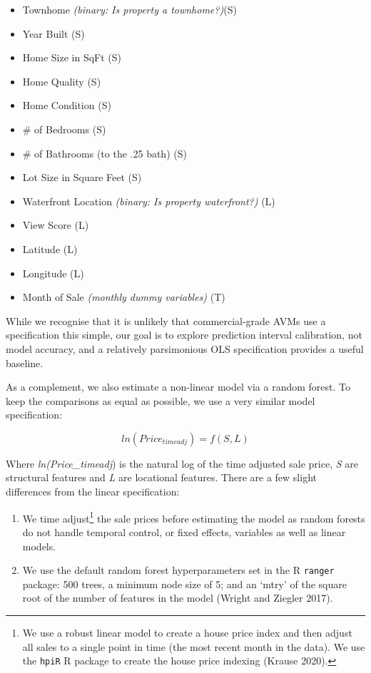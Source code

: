 \documentclass[colTwo]{anon}
\theoremstyle{definition}
\begin{document}
\begin{itemize}
\item Townhome \textit{(binary: Is property a townhome?)}(S)
\item Year Built (S)
\item Home Size in SqFt (S)
\item Home Quality (S)
\item Home Condition (S)
\item \# of Bedrooms (S)
\item \# of Bathrooms (to the .25 bath) (S)
\item Lot Size in Square Feet (S)
\item Waterfront Location \textit{(binary: Is property waterfront?)} (L)
\item View Score (L)
\item Latitude (L)
\item Longitude (L)
\item Month of Sale \textit{(monthly dummy variables)} (T)
\end{itemize}

While we recognise that it is unlikely that commercial-grade AVMs use a specification this simple, our goal is to explore prediction interval calibration, not model accuracy, and a relatively parsimonious OLS specification provides a useful baseline.

As a complement, we also estimate a non-linear model via a random forest.  To keep the comparisons as equal as possible, we use a very similar model specification:

\[ln(Price_{timeadj}) = f(S, L) \]

Where \textit{ln(Price\_timeadj}) is the natural log of the time adjusted sale price, \textit{S} are structural features and \textit{L} are locational features. There are a few slight differences from the linear specification:

\begin{enumerate}
\item We time adjust\footnote{We use a robust linear model to create a house price index and then adjust all sales to a single point in time (the most recent month in the data).  We use the \texttt{hpiR} R package to create the house price indexing (Krause 2020).} the sale prices before estimating the model as random forests do not handle temporal control, or fixed effects, variables as well as linear models.
\item We use the default random forest hyperparameters set in the R \texttt{ranger} package: 500 trees, a minimum node size of 5; and an ‘mtry’ of the square root of the number of features in the model (Wright and Ziegler 2017).
\end{enumerate}
\end{document}
